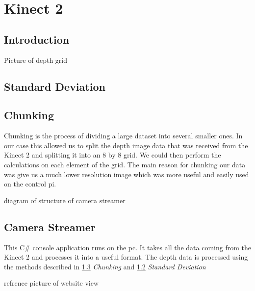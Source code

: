 \section{Kinect 2}

\subsection{Introduction}

Picture of depth grid

\subsection{Standard Deviation}\label{StandardDeviation}

\subsection{Chunking}\label{Chunking}
Chunking is the process of dividing a large dataset into several smaller ones. In our case this allowed us to split the depth image data that was received from the Kinect 2 and splitting it into an 8 by 8 grid. We could then perform the calculations on each element of the grid. The main reason for chunking our data was give us a much lower resolution image which was more useful and easily used on the control pi.

diagram of structure of camera streamer

\subsection{Camera Streamer}
This C\# console application runs on the pc. It takes all the data coming from the Kinect 2 and processes it into a useful format.
The depth data is processed using the methods described in \ref{Chunking} \textit{Chunking} and \ref{StandardDeviation} \textit{Standard Deviation} 


  
refrence picture of website view

\pagestyle{euanstuart}













